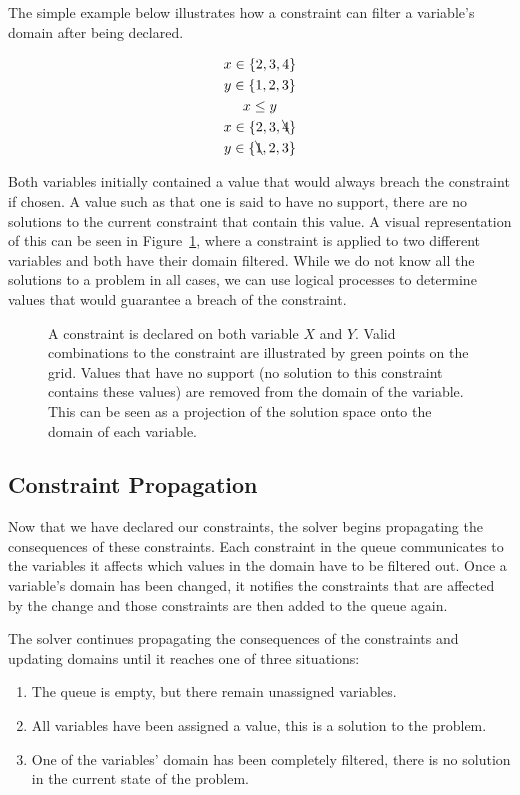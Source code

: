 \documentclass[../Document.tex]{subfiles}
\begin{document}
The simple example below illustrates how a constraint can filter a variable's domain after being declared.

\begin{gather*}
    x \in \{2,3,4\}\\
    y \in \{1,2,3\}\\
    x \leq y\\
    x \in \{2,3,\bcancel{4}\}\\
    y \in \{\bcancel{1},2,3\}
\end{gather*}

Both variables initially contained a value that would always breach the constraint if chosen. A value such as that one is said to have no support, \ie there are no solutions to the current constraint that contain this value. A visual representation of this can be seen in Figure~\ref{fig:domain_filtering}, where a constraint is applied to two different variables and both have their domain filtered. While we do not know all the solutions to a problem in all cases, we can use logical processes to determine values that would guarantee a breach of the constraint.


\begin{figure}[ht]
    \centering
    
    \caption[Domain filtering on one variable.]{A constraint is declared on both variable $X$ and $Y$. Valid combinations to the constraint are illustrated by green points on the grid. Values that have no support (no solution to this constraint contains these values) are removed from the domain of the variable. This can be seen as a projection of the solution space onto the domain of each variable.}
    \label{fig:domain_filtering}
\end{figure} 

\subsection{Constraint Propagation}
Now that we have declared our constraints, the solver begins propagating the consequences of these constraints. Each constraint in the queue communicates to the variables it affects which values in the domain have to be filtered out. Once a variable's domain has been changed, it notifies the constraints that are affected by the change and those constraints are then added to the queue again.

The solver continues propagating the consequences of the constraints and updating domains until it reaches one of three situations: 
\begin{enumerate}
    \item The queue is empty, but there remain unassigned variables.
    \item All variables have been assigned a value, this is a solution to the problem.
    \item One of the variables' domain has been completely filtered, there is no solution in the current state of the problem.
\end{enumerate}
\end{document}
